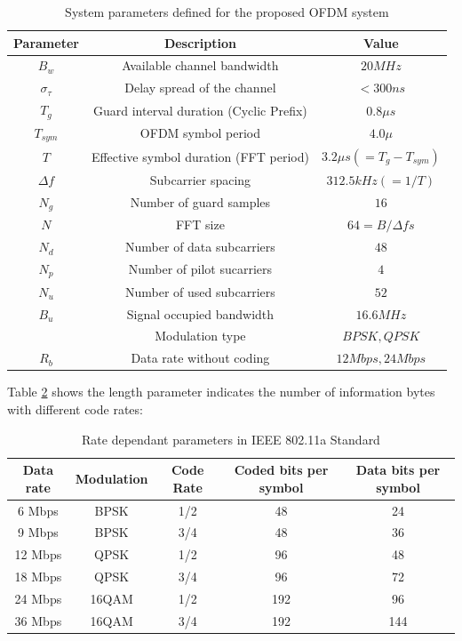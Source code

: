 \begin{table}
\centering
\vspace{0.5cm}
\begin{tabular}{c|c|c}
Parameter&Description&Value\\ \hline
$B_{w}$&Available channel bandwidth&$20MHz$\\
$\sigma_{\tau}$&Delay spread of the channel& $<300 ns$\\
$T_{g}$&Guard interval duration (Cyclic Prefix)&$0.8\mu s$\\
$T_{sym}$&OFDM symbol period&$4.0\mu$\\
$T$&Effective symbol duration (FFT period)&$3.2\mu s (=T_{g}- T_{sym})$\\
$\Delta f$&Subcarrier spacing&$312.5kHz (=1/T)$\\
$N_{g}$&Number of guard samples&$16$\\
$N$&FFT size&$64= B/\Delta f s$\\
$N_{d}$&Number of data subcarriers&$48$\\
$N_{p}$&Number of pilot sucarriers&$4$\\
$N_{u}$&Number of used subcarriers&$52$\\
$B_{u}$&Signal occupied bandwidth&$16.6MHz$\\
&Modulation type&$BPSK, QPSK$\\
$R_{b}$&Data rate without coding&$12Mbps, 24Mbps$\\
\end{tabular}
\caption{System parameters defined for the proposed OFDM system}
\label{table:sys_param}
\end{table}

Table \ref{table:code_vs_rate} shows the length parameter indicates the number of information bytes with different code rates:

\begin{table}
\centering
\vspace{0.5cm}
\begin{tabular}{c|c|c|c|c}
Data rate&Modulation&Code Rate&Coded bits per symbol&Data bits per symbol\\ \hline
6 Mbps&BPSK&1/2&48&24\\
9 Mbps&BPSK&3/4&48&36\\
12 Mbps&QPSK&1/2&96&48\\
18 Mbps&QPSK&3/4&96&72\\
24 Mbps&16QAM&1/2&192&96\\
36 Mbps&16QAM&3/4&192&144\\
\end{tabular}
\caption{Rate dependant parameters in IEEE 802.11a Standard \cite{802_11}}
\label{table:code_vs_rate}
\end{table}

